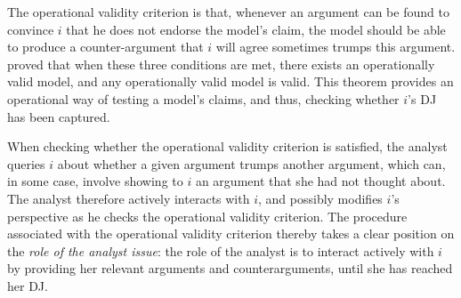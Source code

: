 \documentclass[version=3.21, pagesize, twoside=off, bibliography=totoc, DIV=calc, fontsize=12pt, a4paper, french, english]{scrartcl}
\begin{document}
The operational validity criterion is that, whenever an argument can be found to convince $i$ that he does not endorse the model's claim, the model should be able to produce a counter-argument that $i$ will agree sometimes trumps this argument.  proved that when these three conditions are met, there exists an operationally valid model, and any operationally valid model is valid. 
This theorem provides an operational way of testing a model’s claims, and thus, checking whether $i$’s \ac{DJ} has been captured.

When checking whether the operational validity criterion is satisfied, the analyst queries $i$ about whether a given argument trumps another argument, which can, in some case, involve showing to $i$ an argument that she had not thought about. The analyst therefore actively interacts with $i$, and possibly modifies $i$’s perspective as he checks the operational validity criterion. 
The procedure associated with the operational validity criterion thereby takes a clear position on the \emph{role of the analyst issue}: the role of the analyst is to interact actively with $i$ by providing her relevant arguments and counterarguments, until she has reached her \ac{DJ}.
\end{document}
